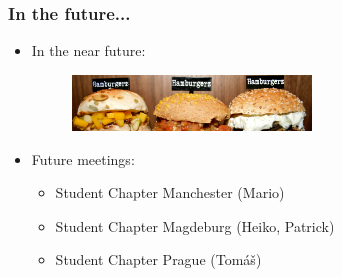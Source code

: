 \documentclass{beamer}
\begin{document}
\begin{frame}
 \frametitle{In the future...}
 \begin{itemize}
  \item In the near future:
    \begin{figure}[t]
  \includegraphics[width=0.6\textwidth]{pics/11.png}
  \end{figure}
  \pause
  \item Future meetings:
  \begin{itemize}
  \item Student Chapter Manchester (Mario)
  \item Student Chapter Magdeburg (Heiko, Patrick)
  \item Student Chapter Prague (Tom{\'a}{\v s})
  \end{itemize}
 \end{itemize}

\end{frame}
\end{document}
